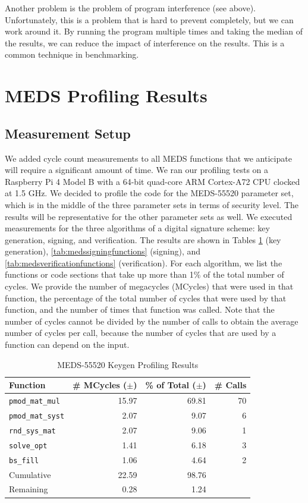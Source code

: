 \documentclass[11pt,a4paper]{report}
\theoremstyle{definition}
\begin{document}
Another problem is the problem of program interference (see above). Unfortunately, this is a problem that is hard to prevent completely, but we can work around it. By running the program multiple times and taking the median of the results, we can reduce the impact of interference on the results. This is a common technique in benchmarking.

\section{MEDS Profiling Results}
\label{sec:medsprofilingresults}

\subsection{Measurement Setup}
We added cycle count measurements to all MEDS functions that we anticipate will require a significant amount of time. We ran our profiling tests on a Raspberry Pi 4 Model B with a 64-bit quad-core ARM Cortex-A72 CPU clocked at 1.5 GHz. We decided to profile the code for the MEDS-55520 parameter set, which is in the middle of the three parameter sets in terms of security level. The results will be representative for the other parameter sets as well. We executed measurements for the three algorithms of a digital signature scheme: key generation, signing, and verification. The results are shown in Tables \ref{tab:medskeygenfunctions} (key generation), \ref{tab:medssigningfunctions} (signing), and \ref{tab:medsverificationfunctions} (verification). For each algorithm, we list the functions or code sections that take up more than 1\% of the total number of cycles. We provide the number of megacycles (MCycles) that were used in that function, the percentage of the total number of cycles that were used by that function, and the number of times that function was called. Note that the number of cycles cannot be divided by the number of calls to obtain the average number of cycles per call, because the number of cycles that are used by a function can depend on the input.

\begin{table}[]
  \centering
  \begin{tabular}{lrrr}
    \toprule
    \textbf{Function} & \textbf{\# MCycles} ($\pm$) & \textbf{\% of Total} ($\pm$) & \textbf{\# Calls} \\
    \midrule
      \texttt{pmod\_mat\_mul} & 15.97 & 69.81 & 70 \\
      \texttt{pmod\_mat\_syst} & 2.07 & 9.07 & 6 \\
      \texttt{rnd\_sys\_mat} & 2.07 & 9.06 & 1 \\
      \texttt{solve\_opt} & 1.41 & 6.18 & 3 \\
      \texttt{bs\_fill} & 1.06 & 4.64 & 2 \\
    \midrule
      Cumulative & 22.59 & 98.76 & \\
      Remaining & 0.28 & 1.24 & \\
    \bottomrule
  \end{tabular}
  \caption{MEDS-55520 Keygen Profiling Results}
  \label{tab:medskeygenfunctions}
\end{table}
\end{document}
